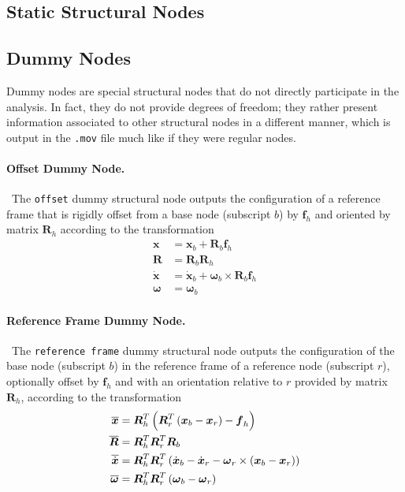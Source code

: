 \documentclass[10pt,dvips,fleqn,subeqn]{report}
\newcommand{\T}[1]{\boldsymbol{#1}}
\begin{document}
\subsection{Static Structural Nodes}

\subsection{Dummy Nodes}
Dummy nodes are special structural nodes that do not directly 
participate in the analysis.
In fact, they do not provide degrees of freedom; they rather
present information associated to other structural nodes 
in a different manner, which is output in the \texttt{.mov}
file much like if they were regular nodes.



\paragraph{Offset Dummy Node.} \
The \texttt{offset} dummy structural node outputs the configuration
of a reference frame that is rigidly offset from a base node
(subscript $b$) by $\T{f}_h$ and oriented by matrix $\T{R}_h$ according 
to the transformation
\begin{align}
	\T{x} &= \T{x}_b + \T{R}_b \T{f}_h \\
	\T{R} &= \T{R}_b \T{R}_h \\
	\dot{\T{x}} &= \dot{\T{x}}_b + \T{\omega}_b \times \T{R}_b \T{f}_h \\
	\T{\omega} &= \T{\omega}_b
\end{align}


\paragraph{Reference Frame Dummy Node.} \
The \texttt{reference frame} dummy structural node
outputs the configuration of the base node (subscript $b$)
in the reference frame of a reference node (subscript $r$),
optionally offset by $\T{f}_h$ and with an orientation relative 
to $r$ provided by matrix $\T{R}_h$,
according to the transformation
\begin{align}
	\overline{\T{x}} &= \T{R}_h^T \plbr{\T{R}_r^T \plbr{\T{x}_b - \T{x}_r} - \T{f}_h}\\
	\overline{\T{R}} &= \T{R}_h^T \T{R}_r^T \T{R}_b \\
	\overline{\dot{\T{x}}} &= \T{R}_h^T \T{R}_r^T \plbr{
		\dot{\T{x}}_b
		- \dot{\T{x}}_r
		- \T{\omega}_r\times\plbr{\T{x}_b - \T{x}_r}
	} \\
	\overline{\T{\omega}} &= \T{R}_h^T \T{R}_r^T \plbr{\T{\omega}_b - \T{\omega}_r}
\end{align}
\end{document}
